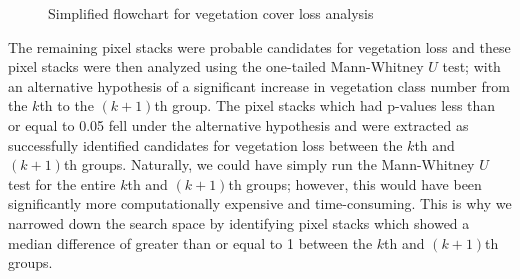 \begin{figure}[H]
	\vspace{5pt}
	\caption{Simplified flowchart for vegetation cover loss analysis}\label{fig19}
\end{figure}

\justify
The remaining pixel stacks were probable candidates for vegetation loss and these pixel stacks were then analyzed using the one-tailed Mann-Whitney $U$ test; with an alternative hypothesis of a significant increase in vegetation class number from the $k$th to the $(k+1)$th group. The pixel stacks which had p-values less than or equal to 0.05 fell under the alternative hypothesis and were extracted as successfully identified candidates for vegetation loss between the $k$th and $(k+1)$th groups. Naturally, we could have simply run the Mann-Whitney $U$ test for the entire $k$th and $(k+1)$th groups; however, this would have been significantly more computationally expensive and time-consuming. This is why we narrowed down the search space by identifying pixel stacks which showed a median difference of greater than or equal to 1 between the $k$th and $(k+1)$th groups.

